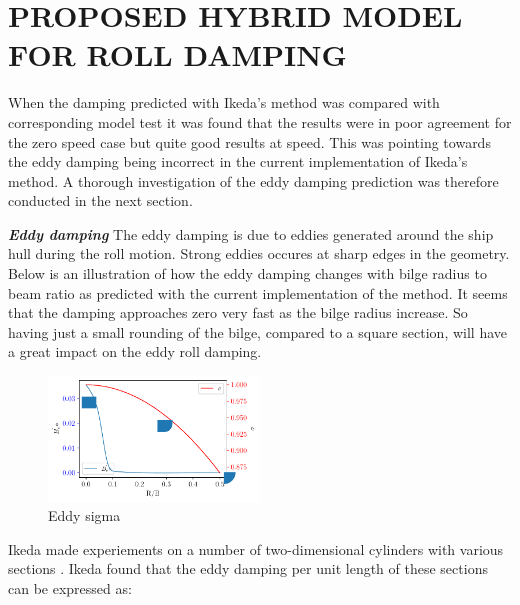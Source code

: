 \section*{PROPOSED HYBRID MODEL FOR ROLL DAMPING}\label{sec:hybrid_damping_model}


When the damping predicted with Ikeda's method was compared with corresponding model test it was found that the results were in poor agreement for the zero speed case but quite good results at speed. This was pointing towards the eddy damping being incorrect in the current
implementation of Ikeda's method. A thorough investigation of the eddy damping prediction was therefore conducted in the next section.

\textbf{\textit{Eddy damping}} The eddy damping is due to eddies generated around the ship hull during the roll motion. Strong eddies occures at sharp edges in the geometry. Below is an illustration of how the eddy damping changes with bilge radius to beam ratio as predicted with the current implementation of the method. It seems that the damping approaches zero very fast as the bilge radius increase. So having just a small rounding of the bilge, compared to a square section, will have a great impact on the eddy roll damping.

    \begin{figure}[H]
        \begin{center}\includegraphics[width = 0.5\textwidth]{figures/eddy_sigma.pdf}\end{center}
        \vspace{-1cm}
        \caption{Eddy sigma}
        \label{fig:eddy_sigma}
    \end{figure}
    
Ikeda made experiements on a number of two-dimensional cylinders with various sections \cite{7505983/4AFVVGNT}. Ikeda found that the eddy damping per unit length of these sections can be expressed as: 

